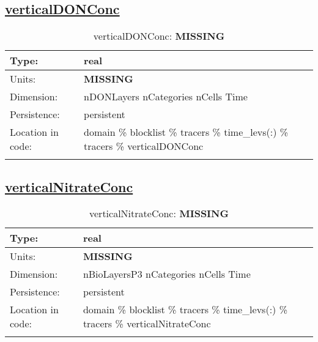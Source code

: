 \subsection[verticalDONConc]{\hyperref[sec:var_tab_tracers]{verticalDONConc}}
\label{subsec:var_sec_tracers_verticalDONConc}
\begin{center}
\begin{longtable}{| p{2.0in} | p{4.0in} |}
        \hline 
        Type: & real \\
        \hline 
        Units: & {\bf \color{red} MISSING} \\
        \hline 
        Dimension: & nDONLayers nCategories nCells Time \\
        \hline 
        Persistence: & persistent \\
        \hline 
         Location in code: & domain \% blocklist \% tracers \% time\_levs(:) \% tracers \% verticalDONConc \\
         \hline 
    \caption{verticalDONConc: {\bf \color{red} MISSING}}
\end{longtable}
\end{center}
\subsection[verticalNitrateConc]{\hyperref[sec:var_tab_tracers]{verticalNitrateConc}}
\label{subsec:var_sec_tracers_verticalNitrateConc}
\begin{center}
\begin{longtable}{| p{2.0in} | p{4.0in} |}
        \hline 
        Type: & real \\
        \hline 
        Units: & {\bf \color{red} MISSING} \\
        \hline 
        Dimension: & nBioLayersP3 nCategories nCells Time \\
        \hline 
        Persistence: & persistent \\
        \hline 
         Location in code: & domain \% blocklist \% tracers \% time\_levs(:) \% tracers \% verticalNitrateConc \\
         \hline 
    \caption{verticalNitrateConc: {\bf \color{red} MISSING}}
\end{longtable}
\end{center}

